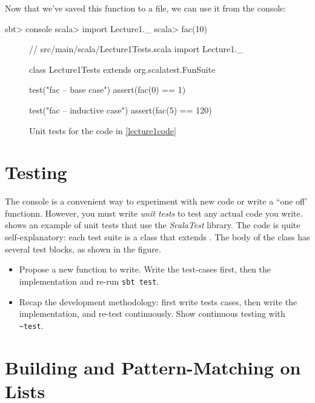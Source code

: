 \documentclass{book}
\begin{document}
Now that we've saved this function to a file, we can use it from the console:
%
\begin{console}
sbt> console
scala> import Lecture1._
scala> fac(10)
\end{console}

\begin{figure}
\begin{scalacode}
// src/main/scala/Lecture1Tests.scala
import Lecture1._

class Lecture1Tests extends org.scalatest.FunSuite {

  test("fac -- base case") {
    assert(fac(0) == 1)
  }

  test("fac -- inductive case") {
    assert(fac(5) == 120)
  }

}
\end{scalacode}
\caption{Unit tests for the code in \cref{lecture1code}}
\label{lecture1tests}
\end{figure}

\section{Testing}

The \sbt{} console is a convenient way to experiment with new code or write
a ``one off' functionn. However, you must write \emph{unit tests} to test
any actual code you write.  shows an example of
unit tests that use the \emph{ScalaTest} library. The code is quite self-explanatory:
each test suite is a class that extends .
The body of the class has several test blocks, as shown in the figure.

\begin{instructor}

\begin{itemize}

\item Propose a new function to write. Write the test-cases first, then
the implementation and re-run \verb|sbt test|.

\item Recap the development methodology: first write tests cases, then
write the implementation, and re-test continuously. Show continuous
testing with \verb|~test|.

\end{itemize}


\end{instructor}

\section{Building and Pattern-Matching on Lists}
\end{document}
